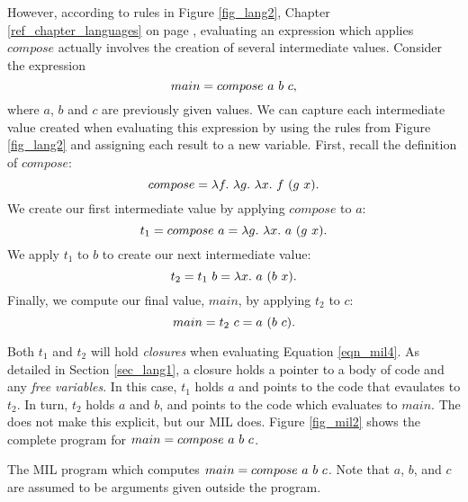 \documentclass[12pt]{report}
\begin{document}
However, according to rules in Figure \ref{fig_lang2}, Chapter
\ref{ref_chapter_languages} on page \pageref{fig_lang2}, evaluating an
expression which applies $compose$ actually involves the creation of
several intermediate values. Consider the expression 
\begin{equation}
  main = compose\ a\ b\ c, \label{eqn_mil4}
\end{equation}
where $a$, $b$ and $c$ are previously given values. We can
capture each intermediate value created when evaluating this 
expression by using the rules from Figure \ref{fig_lang2} and assigning
each result to a new variable. First, recall the definition of $compose$:
\begin{equation}
  compose = \lambda f.\ \lambda g.\ \lambda x.\ f\ (g\ x). 
\end{equation}
We create our first intermediate value by applying $compose$ to $a$:
\begin{equation}
  t_1 = compose\ a = \lambda g.\ \lambda x.\ a\ (g\ x). \label{eqn_mil1}
\end{equation}
We apply $t_1$ to $b$ to create our next intermediate value:
\begin{equation}
  t_2 = t_1\ b = \lambda x.\ a\ (b\ x). \label{eqn_mil2}
\end{equation}
Finally, we compute our final value, $main$, by applying $t_2$ to $c$:
\begin{equation}
  main = t_2\ c = a\ (b\ c). \label{eqn_mil3}  
\end{equation}

Both $t_1$ and $t_2$ will hold \emph{closures} when evaluating
Equation \eqref{eqn_mil4}. As detailed in Section \ref{sec_lang1}, a closure
holds a pointer to a body of code and any \emph{free variables}. In this case,
$t_1$ holds $a$ and points to the code that evaulates to $t_2$. In turn, $t_2$
holds $a$ and $b$, and points to the code which evaluates to $main$. The
\lamA does not make this explicit, but our MIL does. Figure \ref{fig_mil2} shows
the complete program for $main = compose\ a\ b\ c$.

\begin{myfig}[t]
  
  \caption{The MIL program which computes $main = compose\ a\ b\ c$. Note that $a$, $b$, and $c$ are assumed to be arguments given
    outside the program.}
  \label{fig_mil2}
\end{myfig}
\end{document}
